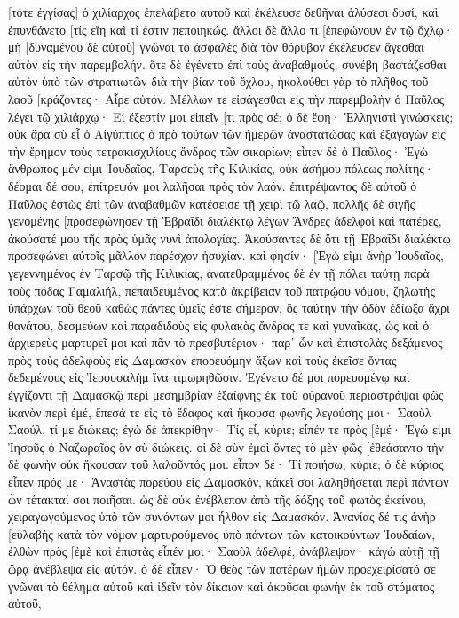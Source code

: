 [τότε ἐγγίσας] ὁ χιλίαρχος ἐπελάβετο αὐτοῦ καὶ ἐκέλευσε δεθῆναι ἁλύσεσι δυσί, καὶ ἐπυνθάνετο [τίς εἴη καὶ τί ἐστιν πεποιηκώς. 
ἄλλοι δὲ ἄλλο τι [ἐπεφώνουν ἐν τῷ ὄχλῳ· μὴ [δυναμένου δὲ αὐτοῦ] γνῶναι τὸ ἀσφαλὲς διὰ τὸν θόρυβον ἐκέλευσεν ἄγεσθαι αὐτὸν εἰς τὴν παρεμβολήν. 
ὅτε δὲ ἐγένετο ἐπὶ τοὺς ἀναβαθμούς, συνέβη βαστάζεσθαι αὐτὸν ὑπὸ τῶν στρατιωτῶν διὰ τὴν βίαν τοῦ ὄχλου, 
ἠκολούθει γὰρ τὸ πλῆθος τοῦ λαοῦ [κράζοντες· Αἶρε αὐτόν. 
Μέλλων τε εἰσάγεσθαι εἰς τὴν παρεμβολὴν ὁ Παῦλος λέγει τῷ χιλιάρχῳ· Εἰ ἔξεστίν μοι εἰπεῖν [τι πρὸς σέ; ὁ δὲ ἔφη· Ἑλληνιστὶ γινώσκεις; 
οὐκ ἄρα σὺ εἶ ὁ Αἰγύπτιος ὁ πρὸ τούτων τῶν ἡμερῶν ἀναστατώσας καὶ ἐξαγαγὼν εἰς τὴν ἔρημον τοὺς τετρακισχιλίους ἄνδρας τῶν σικαρίων; 
εἶπεν δὲ ὁ Παῦλος· Ἐγὼ ἄνθρωπος μέν εἰμι Ἰουδαῖος, Ταρσεὺς τῆς Κιλικίας, οὐκ ἀσήμου πόλεως πολίτης· δέομαι δέ σου, ἐπίτρεψόν μοι λαλῆσαι πρὸς τὸν λαόν. 
ἐπιτρέψαντος δὲ αὐτοῦ ὁ Παῦλος ἑστὼς ἐπὶ τῶν ἀναβαθμῶν κατέσεισε τῇ χειρὶ τῷ λαῷ, πολλῆς δὲ σιγῆς γενομένης [προσεφώνησεν τῇ Ἑβραΐδι διαλέκτῳ λέγων 
Ἄνδρες ἀδελφοὶ καὶ πατέρες, ἀκούσατέ μου τῆς πρὸς ὑμᾶς νυνὶ ἀπολογίας. 
Ἀκούσαντες δὲ ὅτι τῇ Ἑβραΐδι διαλέκτῳ προσεφώνει αὐτοῖς μᾶλλον παρέσχον ἡσυχίαν. καὶ φησίν· 
[Ἐγώ εἰμι ἀνὴρ Ἰουδαῖος, γεγεννημένος ἐν Ταρσῷ τῆς Κιλικίας, ἀνατεθραμμένος δὲ ἐν τῇ πόλει ταύτῃ παρὰ τοὺς πόδας Γαμαλιήλ, πεπαιδευμένος κατὰ ἀκρίβειαν τοῦ πατρῴου νόμου, ζηλωτὴς ὑπάρχων τοῦ θεοῦ καθὼς πάντες ὑμεῖς ἐστε σήμερον, 
ὃς ταύτην τὴν ὁδὸν ἐδίωξα ἄχρι θανάτου, δεσμεύων καὶ παραδιδοὺς εἰς φυλακὰς ἄνδρας τε καὶ γυναῖκας, 
ὡς καὶ ὁ ἀρχιερεὺς μαρτυρεῖ μοι καὶ πᾶν τὸ πρεσβυτέριον· παρ᾽ ὧν καὶ ἐπιστολὰς δεξάμενος πρὸς τοὺς ἀδελφοὺς εἰς Δαμασκὸν ἐπορευόμην ἄξων καὶ τοὺς ἐκεῖσε ὄντας δεδεμένους εἰς Ἰερουσαλὴμ ἵνα τιμωρηθῶσιν. 
Ἐγένετο δέ μοι πορευομένῳ καὶ ἐγγίζοντι τῇ Δαμασκῷ περὶ μεσημβρίαν ἐξαίφνης ἐκ τοῦ οὐρανοῦ περιαστράψαι φῶς ἱκανὸν περὶ ἐμέ, 
ἔπεσά τε εἰς τὸ ἔδαφος καὶ ἤκουσα φωνῆς λεγούσης μοι· Σαοὺλ Σαούλ, τί με διώκεις; 
ἐγὼ δὲ ἀπεκρίθην· Τίς εἶ, κύριε; εἶπέν τε πρὸς [ἐμέ· Ἐγώ εἰμι Ἰησοῦς ὁ Ναζωραῖος ὃν σὺ διώκεις. 
οἱ δὲ σὺν ἐμοὶ ὄντες τὸ μὲν φῶς [ἐθεάσαντο τὴν δὲ φωνὴν οὐκ ἤκουσαν τοῦ λαλοῦντός μοι. 
εἶπον δέ· Τί ποιήσω, κύριε; ὁ δὲ κύριος εἶπεν πρός με· Ἀναστὰς πορεύου εἰς Δαμασκόν, κἀκεῖ σοι λαληθήσεται περὶ πάντων ὧν τέτακταί σοι ποιῆσαι. 
ὡς δὲ οὐκ ἐνέβλεπον ἀπὸ τῆς δόξης τοῦ φωτὸς ἐκείνου, χειραγωγούμενος ὑπὸ τῶν συνόντων μοι ἦλθον εἰς Δαμασκόν. 
Ἁνανίας δέ τις ἀνὴρ [εὐλαβὴς κατὰ τὸν νόμον μαρτυρούμενος ὑπὸ πάντων τῶν κατοικούντων Ἰουδαίων, 
ἐλθὼν πρὸς [ἐμὲ καὶ ἐπιστὰς εἶπέν μοι· Σαοὺλ ἀδελφέ, ἀνάβλεψον· κἀγὼ αὐτῇ τῇ ὥρᾳ ἀνέβλεψα εἰς αὐτόν. 
ὁ δὲ εἶπεν· Ὁ θεὸς τῶν πατέρων ἡμῶν προεχειρίσατό σε γνῶναι τὸ θέλημα αὐτοῦ καὶ ἰδεῖν τὸν δίκαιον καὶ ἀκοῦσαι φωνὴν ἐκ τοῦ στόματος αὐτοῦ, 
